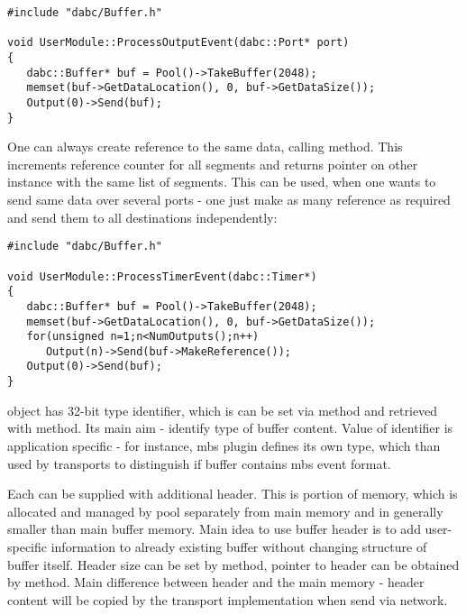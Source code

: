 \begin{small}
\begin{verbatim}     
#include "dabc/Buffer.h"

void UserModule::ProcessOutputEvent(dabc::Port* port)
{
   dabc::Buffer* buf = Pool()->TakeBuffer(2048);
   memset(buf->GetDataLocation(), 0, buf->GetDataSize());
   Output(0)->Send(buf);
}
\end{verbatim}     
\end{small}

One can always create reference to the same data, calling  method.
This increments reference counter for all segments and returns pointer on
other  instance with the same list of segments. This can be used,
when one wants to send same data over several ports - one just make as many reference 
as required and send them to all destinations independently:  

\begin{small}
\begin{verbatim}     
#include "dabc/Buffer.h"

void UserModule::ProcessTimerEvent(dabc::Timer*)
{
   dabc::Buffer* buf = Pool()->TakeBuffer(2048);
   memset(buf->GetDataLocation(), 0, buf->GetDataSize());
   for(unsigned n=1;n<NumOutputs();n++)
      Output(n)->Send(buf->MakeReference());
   Output(0)->Send(buf);
}
\end{verbatim}     
\end{small}



 object has 32-bit type identifier, which is can be set via
 method and retrieved with  method.
Its main aim - identify type of buffer content. Value of   
identifier is application specific - for instance, mbs plugin defines its own type,
which than used by transports to distinguish if buffer contains mbs event format.  

Each  can be supplied with additional header. This is portion of 
memory, which is allocated and managed by pool separately from main memory and 
in generally  smaller than main buffer memory. 
Main idea to use buffer header is to add user-specific
information to already existing buffer without changing structure of buffer itself.
Header size can be set by  method, pointer to header can be
obtained by  method.
Main difference between header and the main memory - header content will be copied by 
the transport implementation when send via network.  


